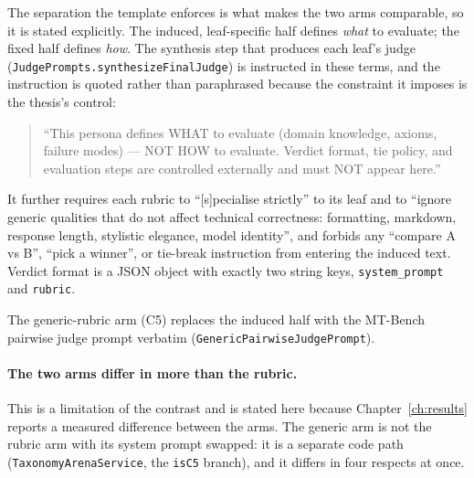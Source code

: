 The separation the template enforces is what makes the two arms
comparable, so it is stated explicitly. The induced, leaf-specific half
defines \emph{what} to evaluate; the fixed half defines \emph{how}. The
synthesis step that produces each leaf's judge
(\texttt{JudgePrompts.synthesizeFinalJudge}) is instructed in these
terms, and the instruction is quoted rather than paraphrased because
the constraint it imposes is the thesis's control:

\begin{quote}\small
``This persona defines WHAT to evaluate (domain knowledge, axioms,
failure modes) --- NOT HOW to evaluate. Verdict format, tie policy, and
evaluation steps are controlled externally and must NOT appear here.''
\end{quote}

\noindent It further requires each rubric to ``[s]pecialise strictly''
to its leaf and to ``ignore generic qualities that do not affect
technical correctness: formatting, markdown, response length, stylistic
elegance, model identity'', and forbids any ``compare A vs B'', ``pick
a winner'', or tie-break instruction from entering the induced text.
Verdict format is a JSON object with exactly two string keys,
\texttt{system\_prompt} and \texttt{rubric}.

The generic-rubric arm (C5) replaces the induced half with the MT-Bench
pairwise judge prompt verbatim (\texttt{GenericPairwiseJudgePrompt}).

\paragraph{The two arms differ in more than the rubric.} This is a limitation of
the contrast and is stated here because Chapter~\ref{ch:results} reports a
measured difference between the arms. The generic arm is not the rubric arm with
its system prompt swapped: it is a separate code path
(\texttt{TaxonomyArenaService}, the \texttt{isC5} branch), and it differs in four
respects at once.


